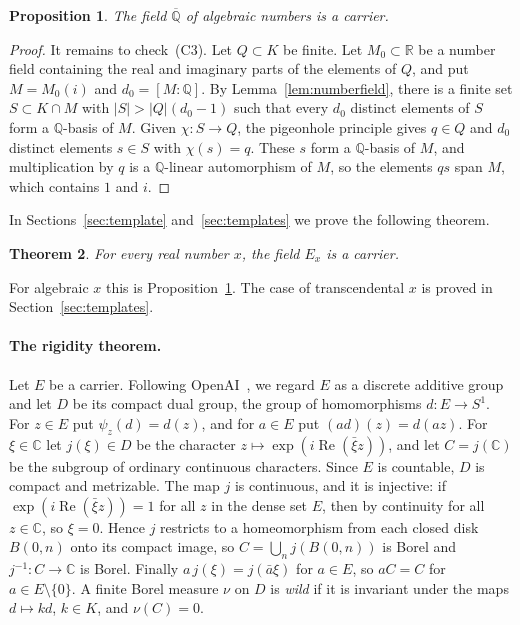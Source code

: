 \documentclass[10pt]{article}
\newtheorem{thm}{Theorem}[section]
\newtheorem{prop}[thm]{Proposition}
\theoremstyle{remark}
\newcommand{\C}{\mathbb C}
\newcommand{\R}{\mathbb R}
\newcommand{\Q}{\mathbb Q}
\newcommand{\Qbar}{\overline{\mathbb Q}}
\DeclareMathOperator{\re}{Re}
\begin{document}
\begin{prop}\label{prop:algebraiccarrier}
The field $\Qbar$ of algebraic numbers is a carrier.
\end{prop}

\begin{proof}
It remains to check~(C3). Let $Q\subset K$ be finite. Let $M_0\subset\R$ be a number field containing the real and imaginary parts of the elements of $Q$, and put $M=M_0(i)$ and $d_0=[M:\Q]$. By Lemma~\ref{lem:numberfield}, there is a finite set $S\subset K\cap M$ with $|S|>|Q|(d_0-1)$ such that every $d_0$ distinct elements of $S$ form a $\Q$-basis of $M$. Given $\chi\colon S\to Q$, the pigeonhole principle gives $q\in Q$ and $d_0$ distinct elements $s\in S$ with $\chi(s)=q$. These $s$ form a $\Q$-basis of $M$, and multiplication by $q$ is a $\Q$-linear automorphism of $M$, so the elements $qs$ span $M$, which contains $1$ and $i$.
\end{proof}

In Sections~\ref{sec:template} and~\ref{sec:templates} we prove the following theorem.

\begin{thm}\label{thm:carrier}
For every real number $x$, the field $E_x$ is a carrier.
\end{thm}

For algebraic $x$ this is Proposition~\ref{prop:algebraiccarrier}. The case of transcendental $x$ is proved in Section~\ref{sec:templates}.

\paragraph{The rigidity theorem.} Let $E$ be a carrier. Following OpenAI~\cite[Definition~2.1]{OAI}, we regard $E$ as a discrete additive group and let $D$ be its compact dual group, the group of homomorphisms $d\colon E\to S^1$. For $z\in E$ put $\psi_z(d)=d(z)$, and for $a\in E$ put $(ad)(z)=d(az)$. For $\xi\in\C$ let $j(\xi)\in D$ be the character $z\mapsto\exp(i\re(\bar\xi z))$, and let $C=j(\C)$ be the subgroup of ordinary continuous characters. Since $E$ is countable, $D$ is compact and metrizable. The map $j$ is continuous, and it is injective: if $\exp(i\re(\bar\xi z))=1$ for all $z$ in the dense set $E$, then by continuity for all $z\in\C$, so $\xi=0$. Hence $j$ restricts to a homeomorphism from each closed disk $B(0,n)$ onto its compact image, so $C=\bigcup_nj(B(0,n))$ is Borel and $j^{-1}\colon C\to\C$ is Borel. Finally $a\,j(\xi)=j(\bar a\xi)$ for $a\in E$, so $aC=C$ for $a\in E\setminus\{0\}$. A finite Borel measure $\nu$ on $D$ is \emph{wild} if it is invariant under the maps $d\mapsto kd$, $k\in K$, and $\nu(C)=0$.
\end{document}
